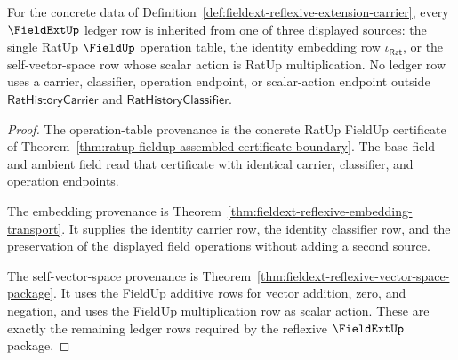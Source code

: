 \begin{theorem}
\label{thm:fieldext-reflexive-ledger-provenance}
For the concrete data of
Definition~\ref{def:fieldext-reflexive-extension-carrier}, every
$\FieldExtUp$ ledger row is inherited from one of three displayed sources:
the single RatUp $\FieldUp$ operation table, the identity embedding row
$\iota_{\mathsf{Rat}}$, or the self-vector-space row whose scalar action is
RatUp multiplication. No ledger row uses a carrier, classifier, operation
endpoint, or scalar-action endpoint outside
$\mathsf{RatHistoryCarrier}$ and $\mathsf{RatHistoryClassifier}$.
\end{theorem}
\begin{proof}
The operation-table provenance is the concrete RatUp FieldUp certificate of
Theorem~\ref{thm:ratup-fieldup-assembled-certificate-boundary}. The base
field and ambient field read that certificate with identical carrier,
classifier, and operation endpoints.

The embedding provenance is
Theorem~\ref{thm:fieldext-reflexive-embedding-transport}. It supplies the
identity carrier row, the identity classifier row, and the preservation of
the displayed field operations without adding a second source.

The self-vector-space provenance is
Theorem~\ref{thm:fieldext-reflexive-vector-space-package}. It uses the
FieldUp additive rows for vector addition, zero, and negation, and uses the
FieldUp multiplication row as scalar action. These are exactly the remaining
ledger rows required by the reflexive $\FieldExtUp$ package.
\end{proof}

